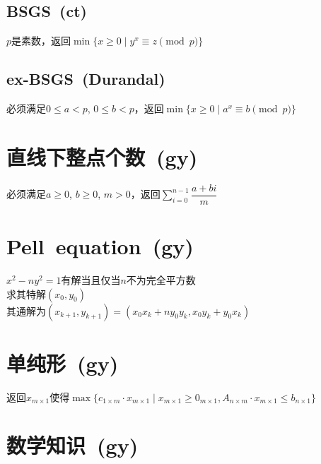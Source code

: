     \subsection*{BSGS~\small(ct)}
        $ p $是素数，返回$ \min\lbrace x \geq 0 \mid y^x \equiv z \pmod p \rbrace $
    \subsection*{ex-BSGS~\small(Durandal)}
        必须满足$ 0 \leq a < p $, $ 0 \leq b < p $，返回$ \min\lbrace x \geq 0 \mid a^x \equiv b \pmod p\rbrace $

\section{直线下整点个数~\small(gy)}
    必须满足$ a \geq 0 $, $ b \geq 0 $, $ m > 0 $，返回$ \sum\limits_{i=0}^{n-1} \dfrac{a + bi}{m} $

\section{Pell~equation~\small(gy)}
    $ x^2 - n y^2 = 1 $有解当且仅当$ n $不为完全平方数
    \\求其特解$ (x_0, y_0) $
    \\其通解为$ (x_{k + 1}, y_{k + 1}) = (x_0 x_k + n y_0 y_k, x_0 y_k + y_0 x_k ) $

\section{单纯形~\small(gy)}
    返回$ x_{m \times 1} $使得$ \max \lbrace c_{1 \times m} \cdot x_{m \times 1} \mid x_{m \times 1} \geq 0_{m \times 1}, A_{n \times m} \cdot x_{m \times 1} \leq b_{n \times 1} \rbrace $

\section{数学知识~\small(gy)}
    
